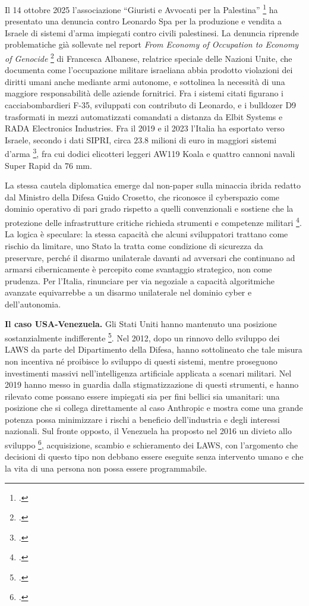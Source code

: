 \documentclass[a4paper,12pt]{report}
\begin{document}
Il 14 ottobre 2025 l'associazione ``Giuristi e Avvocati per la Palestina''
\footcite{denunciacpi} ha presentato una denuncia contro Leonardo Spa per la
produzione e vendita a Israele di sistemi d'arma impiegati contro civili
palestinesi. La denuncia riprende problematiche già sollevate nel report
\textit{From Economy of Occupation to Economy of Genocide}
\footcite{albanese_report} di Francesca Albanese, relatrice speciale delle
Nazioni Unite, che documenta come l'occupazione militare israeliana abbia
prodotto violazioni dei diritti umani anche mediante armi autonome, e sottolinea
la necessità di una maggiore responsabilità delle aziende fornitrici. Fra i
sistemi citati figurano i cacciabombardieri F-35, sviluppati con contributo di
Leonardo, e i bulldozer D9 trasformati in mezzi automatizzati comandati a
distanza da Elbit Systems e RADA Electronics Industries. Fra il 2019 e il 2023
l'Italia ha esportato verso Israele, secondo i dati SIPRI, circa $23.8$ milioni
di euro in maggiori sistemi d'arma \footcite{iriad_2025_export_israele}, fra cui dodici elicotteri leggeri AW119 Koala e quattro cannoni navali Super Rapid da
$76$ mm.
 
La stessa cautela diplomatica emerge dal non-paper sulla minaccia ibrida redatto
dal Ministro della Difesa Guido Crosetto, che riconosce il cyberspazio come
dominio operativo di pari grado rispetto a quelli convenzionali e sostiene che
la protezione delle infrastrutture critiche richieda strumenti e competenze
militari \footcite{crosetto_2025_nonpaper}. La logica è speculare: la stessa capacità che alcuni sviluppatori trattano come rischio
da limitare, uno Stato la tratta come condizione di sicurezza da preservare,
perché il disarmo unilaterale davanti ad avversari che continuano ad armarsi
cibernicamente è percepito come svantaggio strategico, non come prudenza. Per l'Italia, rinunciare
per via negoziale a capacità algoritmiche avanzate equivarrebbe a un disarmo
unilaterale nel dominio cyber e dell'autonomia.
 
\textbf{Il caso USA-Venezuela.}
Gli Stati Uniti hanno mantenuto una posizione sostanzialmente indifferente
\footcite[p.~52]{wareham_2020}. Nel
2012, dopo un rinnovo dello sviluppo dei LAWS da parte del Dipartimento della
Difesa, hanno sottolineato che tale misura non incentiva né proibisce lo
sviluppo di questi sistemi, mentre proseguono investimenti massivi
nell'intelligenza artificiale applicata a scenari militari. Nel 2019 hanno messo
in guardia dalla stigmatizzazione di questi strumenti, e hanno rilevato come
possano essere impiegati sia per fini bellici sia umanitari: una posizione che
si collega direttamente al caso Anthropic e mostra come una grande potenza possa
minimizzare i rischi a beneficio dell'industria e degli interessi nazionali. Sul
fronte opposto, il Venezuela ha proposto nel 2016 un divieto allo sviluppo
\footcite[p.~53]{wareham_2020},
acquisizione, scambio e schieramento dei LAWS, con l'argomento che decisioni di
questo tipo non debbano essere eseguite senza intervento umano e che la vita di
una persona non possa essere programmabile.
 
\end{document}
